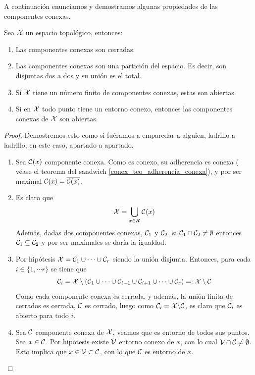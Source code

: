 A continuación enunciamos y demostramos algunas propiedades de las componentes conexas.

\begin{lem}
	Sea $\mathcal{X}$ un espacio topológico, entonces:
	\begin{enumerate}
		\item Las componentes conexas son cerradas.
		
		\item Las componentes conexas son una partición del espacio. Es decir, son disjuntas dos a dos y su unión es el total.
		
		\item Si $\mathcal{X}$ tiene un número finito de componentes conexas, estas son abiertas.
		\item Si en $\mathcal{X}$ todo punto tiene un entorno conexo, entonces las componentes conexas de $\mathcal{X}$ son abiertas.
	\end{enumerate}
\end{lem}
\begin{proof}
	Demostremos esto como si fuéramos a emparedar a alguien, ladrillo a ladrillo, en este caso, apartado a apartado.
	\begin{enumerate}
		\item Sea $\mathcal{C}(x)$ componente conexa. Como es conexo, su adherencia es conexa ( véase el teorema del sandwich \ref{conex_teo_adherencia_conexa}), y por ser maximal $\mathcal{C}(x)=\overline{\mathcal{C}(x)}$.
		
		\item Es claro que
		\[\mathcal{X}=\bigcup_{x\in\mathcal{X}} \mathcal{C}(x)\]
		Además, dadas dos componentes conexas, $\mathcal{C}_1$ y $\mathcal{C}_2$, si $\mathcal{C}_1\cap\mathcal{C}_2\not=\emptyset$ entonces $\mathcal{C}_1\subseteq\mathcal{C}_2$ y por ser maximales se daría la igualdad.
		
		\item Por hipótesis $\mathcal{X}=\mathcal{C}_1\cup\cdots\cup\mathcal{C}_r$ siendo la unión disjunta. Entonces, para cada $i\in\{1,\cdots r\}$ se tiene que 
		\[\mathcal{C}_i=\mathcal{X}\setminus (\mathcal{C}_1\cup\cdots\cup\mathcal{C}_{i-1}\cup\mathcal{C}_{i+1}\cup\cdots\cup\mathcal{C}_r)=:\mathcal{X}\setminus \mathcal{C}\]
		Como cada componente conexa es cerrada, y además, la unión finita de cerrados es cerrada, $\mathcal{C}$ es cerrado, luego como $\mathcal{C}_i=\mathcal{X}\backslash \mathcal{C}$, es claro que $\mathcal{C}_i$ es abierto para todo $i$.
		
		\item Sea $\mathcal{C}$ componente conexa de $\mathcal{X}$, veamos que es entorno de todos sus puntos. Sea $x\in\mathcal{C}$. Por hipótesis existe $\mathcal{V}$ entorno conexo de $x$, con lo cual $\mathcal{V}\cap\mathcal{C}\not=\emptyset$. Esto implica que $x\in\mathcal{V}\subset\mathcal{C}$, con lo que $\mathcal{C}$ es entorno de $x$.\qedhere
	\end{enumerate}
\end{proof}
